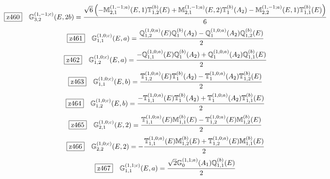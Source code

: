 \documentclass[fleqn,10pt,landscape]{jsarticle}
\begin{document}
\begin{dmath*}
\hspace*{3mm}\fbox{z460}\quad \mathbb{G}_{3,2}^{(1,-1;c)}(E,2b)=\frac{\sqrt{6} \left(- \mathbb{M}_{2,1}^{(1,-1;a)}(E,1) \mathbb{T}_{1,2}^{(b)}(E) + \mathbb{M}_{2,1}^{(1,-1;a)}(E,2) \mathbb{T}_{1}^{(b)}(A_{2}) - \mathbb{M}_{2,2}^{(1,-1;a)}(E,1) \mathbb{T}_{1,1}^{(b)}(E)\right)}{6}
\end{dmath*}
\begin{dmath*}
\hspace*{3mm}\fbox{z461}\quad \mathbb{G}_{1,1}^{(1,0;c)}(E,a)=\frac{\mathbb{Q}_{1,2}^{(1,0;a)}(E) \mathbb{Q}_{1}^{(b)}(A_{2}) - \mathbb{Q}_{1}^{(1,0;a)}(A_{2}) \mathbb{Q}_{1,2}^{(b)}(E)}{2}
\end{dmath*}
\begin{dmath*}
\hspace*{3mm}\fbox{z462}\quad \mathbb{G}_{1,2}^{(1,0;c)}(E,a)=\frac{- \mathbb{Q}_{1,1}^{(1,0;a)}(E) \mathbb{Q}_{1}^{(b)}(A_{2}) + \mathbb{Q}_{1}^{(1,0;a)}(A_{2}) \mathbb{Q}_{1,1}^{(b)}(E)}{2}
\end{dmath*}
\begin{dmath*}
\hspace*{3mm}\fbox{z463}\quad \mathbb{G}_{1,1}^{(1,0;c)}(E,b)=\frac{\mathbb{T}_{1,2}^{(1,0;a)}(E) \mathbb{T}_{1}^{(b)}(A_{2}) - \mathbb{T}_{1}^{(1,0;a)}(A_{2}) \mathbb{T}_{1,2}^{(b)}(E)}{2}
\end{dmath*}
\begin{dmath*}
\hspace*{3mm}\fbox{z464}\quad \mathbb{G}_{1,2}^{(1,0;c)}(E,b)=\frac{- \mathbb{T}_{1,1}^{(1,0;a)}(E) \mathbb{T}_{1}^{(b)}(A_{2}) + \mathbb{T}_{1}^{(1,0;a)}(A_{2}) \mathbb{T}_{1,1}^{(b)}(E)}{2}
\end{dmath*}
\begin{dmath*}
\hspace*{3mm}\fbox{z465}\quad \mathbb{G}_{2,1}^{(1,0;c)}(E,2)=\frac{\mathbb{T}_{1,1}^{(1,0;a)}(E) \mathbb{M}_{1,1}^{(b)}(E) - \mathbb{T}_{1,2}^{(1,0;a)}(E) \mathbb{M}_{1,2}^{(b)}(E)}{2}
\end{dmath*}
\begin{dmath*}
\hspace*{3mm}\fbox{z466}\quad \mathbb{G}_{2,2}^{(1,0;c)}(E,2)=- \frac{\mathbb{T}_{1,1}^{(1,0;a)}(E) \mathbb{M}_{1,2}^{(b)}(E) + \mathbb{T}_{1,2}^{(1,0;a)}(E) \mathbb{M}_{1,1}^{(b)}(E)}{2}
\end{dmath*}
\begin{dmath*}
\hspace*{3mm}\fbox{z467}\quad \mathbb{G}_{1,1}^{(1,1;c)}(E,a)=\frac{\sqrt{2} \mathbb{G}_{0}^{(1,1;a)}(A_{1}) \mathbb{Q}_{1,1}^{(b)}(E)}{2}
\end{dmath*}
\end{document}
